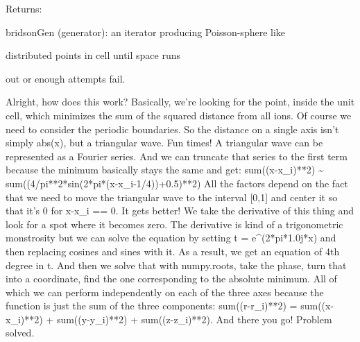 \documentclass[letterpaper,10pt,english]{sphinxmanual}
\begin{document}
\begin{fulllineitems}
\begin{DUlineblock}{0em}
\item[] Returns:
\item[]
\begin{DUlineblock}{\DUlineblockindent}
\item[] bridsonGen (generator): an iterator producing Poisson-sphere like
\item[]
\begin{DUlineblock}{\DUlineblockindent}
\item[] distributed points in cell until space runs
\item[] out or enough attempts fail.
\end{DUlineblock}
\end{DUlineblock}
\end{DUlineblock}

\end{fulllineitems}


\begin{fulllineitems}
\label{doctree/soprano.utils:soprano.utils.periodic_center}
Alright, how does this work?
Basically, we're looking for the point, inside the unit cell, which
minimizes the sum of the squared distance from all ions.
Of course we need to consider the periodic boundaries. So the distance
on a single axis isn't simply abs(x), but a triangular wave.
Fun times! A triangular wave can be represented as a Fourier series. And
we can truncate that series to the first term because the minimum
basically stays the same and get:
sum((x-x\_i)**2) \textasciitilde{} sum((4/pi**2*sin(2*pi*(x-x\_i-1/4))+0.5)**2)
All the factors depend on the fact that we need to move the triangular
wave to the interval {[}0,1{]} and center it so that it's 0 for x-x\_i == 0.
It gets better! We take the derivative of this thing and look for a spot
where it becomes zero. The derivative is kind of a trigonometric
monstrosity but we can solve the equation by setting t = e\textasciicircum{}(2*pi*1.0j*x)
and then replacing cosines and sines with it. As a result, we get an
equation of 4th degree in t. And then we solve that with numpy.roots, take
the phase, turn that into a coordinate, find the one corresponding to the
absolute minimum.
All of which we can perform independently on each of the three axes
because the function is just the sum of the three components:
sum((r-r\_i)**2) = sum((x-x\_i)**2) + sum((y-y\_i)**2) + sum((z-z\_i)**2).
And there you go! Problem solved.

\end{fulllineitems}
\end{document}
